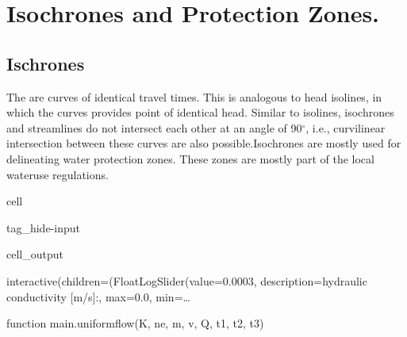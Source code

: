 \documentclass[letterpaper,10pt,english]{jupyterBook}
\begin{document}
\section{Isochrones and Protection Zones.}
\label{\detokenize{content/flow/L6/16_darcy_law_3D:isochrones-and-protection-zones}}

\subsection{Ischrones}
\label{\detokenize{content/flow/L6/16_darcy_law_3D:ischrones}}
\sphinxAtStartPar
The  are curves of identical travel times. This is analogous to head isolines, in which the curves provides point of identical head. Similar to isolines, isochrones and streamlines do not  intersect each other at an angle of 90\(^\circ\), i.e., curvilinear intersection between these curves are also possible.Isochrones are mostly used for delineating water protection zones. These zones are mostly part of the local water\sphinxhyphen{}use regulations.

\begin{sphinxuseclass}{cell}
\begin{sphinxuseclass}{tag_hide-input}\begin{sphinxVerbatimOutput}

\begin{sphinxuseclass}{cell_output}
\begin{sphinxVerbatim}[commandchars=\\\{\}]
interactive(children=(FloatLogSlider(value=0.0003, description=\PYGZsq{}hydraulic conductivity [m/s]:\PYGZsq{}, max=0.0, min=\PYGZhy{}…
\end{sphinxVerbatim}

\begin{sphinxVerbatim}[commandchars=\\\{\}]
\PYGZlt{}function \PYGZus{}\PYGZus{}main\PYGZus{}\PYGZus{}.uniform\PYGZus{}flow(K, ne, m, v, Q, t1, t2, t3)\PYGZgt{}
\end{sphinxVerbatim}

\end{sphinxuseclass}\end{sphinxVerbatimOutput}

\end{sphinxuseclass}
\end{sphinxuseclass}
\end{document}
